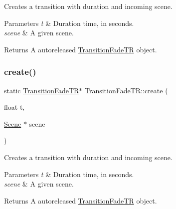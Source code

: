 Creates a transition with duration and incoming scene.


\begin{DoxyParams}{Parameters}
{\em t} & Duration time, in seconds. \\
\hline
{\em scene} & A given scene. \\
\hline
\end{DoxyParams}
\begin{DoxyReturn}{Returns}
A autoreleased \hyperlink{classTransitionFadeTR}{Transition\+Fade\+TR} object. 
\end{DoxyReturn}
\mbox{\label{classTransitionFadeTR_ad82cca6854361bd5f21bf47d8bf182b0}} 
\subsubsection{\texorpdfstring{create()}{create()}\hspace{0.1cm}{\footnotesize\ttfamily [2/2]}}
{\footnotesize\ttfamily static \hyperlink{classTransitionFadeTR}{Transition\+Fade\+TR}$\ast$ Transition\+Fade\+T\+R\+::create (\begin{DoxyParamCaption}\item[{float}]{t,  }\item[{\hyperlink{classScene}{Scene} $\ast$}]{scene }\end{DoxyParamCaption})\hspace{0.3cm}{\ttfamily [static]}}

Creates a transition with duration and incoming scene.


\begin{DoxyParams}{Parameters}
{\em t} & Duration time, in seconds. \\
\hline
{\em scene} & A given scene. \\
\hline
\end{DoxyParams}
\begin{DoxyReturn}{Returns}
A autoreleased \hyperlink{classTransitionFadeTR}{Transition\+Fade\+TR} object. 
\end{DoxyReturn}
\mbox{\label{classTransitionFadeTR_ae96994b31bd3e6c6bc93b630b5d5edd1}} 
